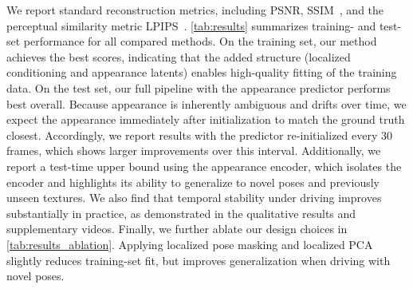 \documentclass[runningheads]{llncs}
\begin{document}
We report standard reconstruction metrics, including PSNR, SSIM~\cite{wang2004ssim}, and the perceptual similarity metric LPIPS~\cite{zhang2018perceptual}.
\cref{tab:results} summarizes training- and test-set performance for all compared methods.
On the training set, our method achieves the best scores, indicating that the added structure (localized conditioning and appearance latents) enables high-quality fitting of the training data.
On the test set, our full pipeline with the appearance predictor performs best overall.
Because appearance is inherently ambiguous and drifts over time, we expect the appearance immediately after initialization to match the ground truth closest.
Accordingly, we report results with the predictor re-initialized every 30 frames, which shows larger improvements over this interval.
Additionally, we report a test-time upper bound using the appearance encoder, which isolates the encoder and highlights its ability to generalize to novel poses and previously unseen textures.
We also find that temporal stability under driving improves substantially in practice, as demonstrated in the qualitative results and supplementary videos.
Finally, we further ablate our design choices in \cref{tab:results_ablation}.
Applying localized pose masking and localized PCA slightly reduces training-set fit, but improves generalization when driving with novel poses.

\end{document}
